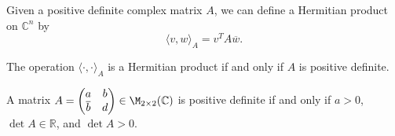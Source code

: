 Given a positive definite complex matrix $A$, we can define a Hermitian product on $\mathbb{C}^n$ by
\begin{equation*}
    \langle v, w \rangle_A = v^T A \overline{w}.
\end{equation*}

\begin{claim*}
    The operation $\langle \cdot, \cdot \rangle_A$ is a Hermitian product if and only if $A$ is positive definite.
\end{claim*}

\begin{exercise}
    A matrix $A = \begin{pmatrix} a & b \\ \overline{b} & d \end{pmatrix} \in \M_{2 \times 2}(\mathbb{C})$ is positive definite if and only if $a > 0$, $\det A \in \mathbb{R}$, and $\det A > 0$.
\end{exercise}

